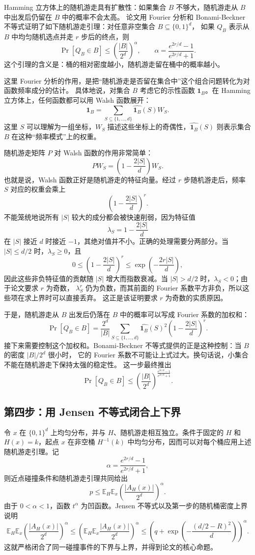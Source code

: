 \documentclass[UTF8,11pt,a4paper]{ctexart}
\newcommand{\Prb}{\operatorname{Pr}}
\newcommand{\E}{\mathbb{E}}
\begin{document}
Hamming 立方体上的随机游走具有扩散性：如果集合 $B$ 不够大，随机游走从 $B$ 中出发后仍留在 $B$ 中的概率不会太高。
论文用 Fourier 分析和 Bonami-Beckner 不等式证明了如下随机游走引理：对任意非空集合 $B\subseteq\{0,1\}^d$，
如果 $Q_B$ 表示从 $B$ 中均匀随机选点并走 $r$ 步后的终点，则
\[
  \Prb[Q_B\in B]
  \le
  \left(\frac{|B|}{2^d}\right)^\alpha,
  \qquad
  \alpha=
  \frac{e^{2r/d}-1}{e^{2r/d}+1}.
\]
这个引理的含义是：桶的相对密度越小，随机游走留在桶中的概率越小。

这里 Fourier 分析的作用，是把“随机游走是否留在集合中”这个组合问题转化为对函数频率成分的估计。
具体地说，对集合 $B$ 考虑它的示性函数 $\mathbf{1}_B$。在 Hamming 立方体上，任何函数都可以用 Walsh 函数展开：
\[
  \mathbf{1}_B
  =
  \sum_{S\subseteq\{1,\dots,d\}}
  \widehat{\mathbf{1}_B}(S)W_S.
\]
这里 $S$ 可以理解为一组坐标，$W_S$ 描述这些坐标上的奇偶性，$\widehat{\mathbf{1}_B}(S)$ 则表示集合 $B$ 在这种“频率模式”上的权重。

随机游走矩阵 $P$ 对 Walsh 函数的作用非常简单：
\[
  P W_S
  =
  \left(1-\frac{2|S|}{d}\right)W_S.
\]
也就是说，Walsh 函数正好是随机游走的特征向量。经过 $r$ 步随机游走后，频率 $S$ 对应的权重会乘上
\[
  \left(1-\frac{2|S|}{d}\right)^r.
\]
不能笼统地说所有 $|S|$ 较大的成分都会被快速削弱，因为特征值
\[
  \lambda_S=1-\frac{2|S|}{d}
\]
在 $|S|$ 接近 $d$ 时接近 $-1$，其绝对值并不小。正确的处理需要分两部分。当 $|S|\le d/2$ 时，$\lambda_S\ge0$，且
\[
  0\le
  \left(1-\frac{2|S|}{d}\right)^r
  \le
  \exp\left(-\frac{2r|S|}{d}\right),
\]
因此这些非负特征值的贡献随 $|S|$ 增大而指数衰减。当 $|S|>d/2$ 时，$\lambda_S<0$；由于论文要求 $r$ 为奇数，
$\lambda_S^r$ 仍为负数，而其前面的 Fourier 系数平方非负，所以这些项在求上界时可以直接丢弃。
这正是该证明要求 $r$ 为奇数的实质原因。

于是，随机游走从 $B$ 出发后仍落在 $B$ 中的概率可以写成 Fourier 系数的加权和：
\[
  \Prb[Q_B\in B]
  =
  \frac{2^d}{|B|}
  \sum_{S\subseteq\{1,\dots,d\}}
  \widehat{\mathbf{1}_B}(S)^2
  \left(1-\frac{2|S|}{d}\right)^r.
\]
接下来需要控制这个加权和。Bonami-Beckner 不等式提供的正是这种控制：当 $B$ 的密度 $|B|/2^d$ 很小时，
它的 Fourier 系数不可能让上式过大。换句话说，小集合不能在随机游走下保持太强的稳定性。
这一步最终推出
\[
  \Prb[Q_B\in B]
  \le
  \left(\frac{|B|}{2^d}\right)^{
    \frac{e^{2r/d}-1}{e^{2r/d}+1}
  }.
\]

\subsection{第四步：用 Jensen 不等式闭合上下界}

令 $x$ 在 $\{0,1\}^d$ 上均匀分布，并与 $H$、随机游走相互独立。条件于固定的 $H$ 和
$H(x)=k$，起点 $x$ 在非空桶 $H^{-1}(k)$ 中均匀分布，因而可以对每个桶应用上述随机游走引理。记
\[
  \alpha=\frac{e^{2r/d}-1}{e^{2r/d}+1},
\]
则近点碰撞条件和随机游走引理共同给出
\[
  p
  \le
  \E_H\E_x
  \left(\frac{|A_H(x)|}{2^d}\right)^\alpha.
\]
由于 $0<\alpha<1$，函数 $t^\alpha$ 为凹函数。Jensen 不等式以及第一步的随机桶密度上界说明
\[
  \E_H\E_x
  \left(\frac{|A_H(x)|}{2^d}\right)^\alpha
  \le
  \left(
    \E_H\E_x\frac{|A_H(x)|}{2^d}
  \right)^\alpha
  \le
  \left(
    q+\exp\left(-\frac{(d/2-R)^2}{d}\right)
  \right)^\alpha.
\]
这就严格闭合了同一碰撞事件的下界与上界，并得到论文的核心命题。
\end{document}

